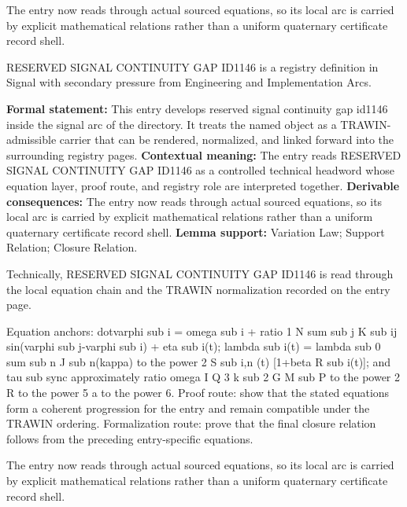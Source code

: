 The entry now reads through actual sourced equations, so its local arc is carried by explicit mathematical relations rather than a uniform quaternary certificate record shell.
\clearpage


\begingroup\small
{}
RESERVED SIGNAL CONTINUITY GAP ID1146 is a registry definition in Signal with secondary pressure from Engineering and Implementation Arcs.

\begingroup\footnotesize\setlength{\emergencystretch}{3em}\sloppy
\textbf{Formal statement:} This entry develops reserved signal continuity gap id1146 inside the signal arc of the directory. It treats the named object as a TRAWIN-admissible carrier that can be rendered, normalized, and linked forward into the surrounding registry pages. \textbf{Contextual meaning:} The entry reads RESERVED SIGNAL CONTINUITY GAP ID1146 as a controlled technical headword whose equation layer, proof route, and registry role are interpreted together. \textbf{Derivable consequences:} The entry now reads through actual sourced equations, so its local arc is carried by explicit mathematical relations rather than a uniform quaternary certificate record shell. \textbf{Lemma support:} Variation Law; Support Relation; Closure Relation.\par
\endgroup

Technically, RESERVED SIGNAL CONTINUITY GAP ID1146 is read through the local equation chain and the TRAWIN normalization recorded on the entry page.

Equation anchors: dotvarphi sub i = omega sub i + ratio 1 N sum sub j K sub ij sin(varphi sub j-varphi sub i) + eta sub i(t); lambda sub i(t) = lambda sub 0 sum sub n J sub n(kappa) to the power 2 S sub i,n (t) [1+beta R sub i(t)]; and tau sub sync approximately ratio omega I Q 3 k sub 2 G M sub P to the power 2 R to the power 5 a to the power 6. Proof route: show that the stated equations form a coherent progression for the entry and remain compatible under the TRAWIN ordering. Formalization route: prove that the final closure relation follows from the preceding entry-specific equations.

The entry now reads through actual sourced equations, so its local arc is carried by explicit mathematical relations rather than a uniform quaternary certificate record shell.
\endgroup

